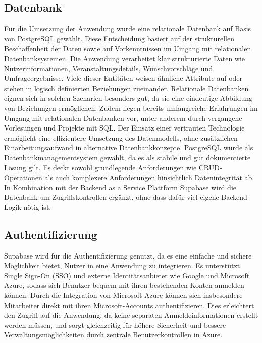 \documentclass[a4paper,12pt]{article}
\begin{document}
\subsection{Datenbank}
Für die Umsetzung der Anwendung wurde eine relationale Datenbank auf Basis von PostgreSQL gewählt. Diese Entscheidung basiert auf der strukturellen Beschaffenheit der Daten sowie auf Vorkenntnissen im Umgang mit relationalen Datenbanksystemen. Die Anwendung verarbeitet klar strukturierte Daten wie Nutzerinformationen, Veranstaltungsdetails, Wunschvorschläge und Umfrageergebnisse. Viele dieser Entitäten weisen ähnliche Attribute auf oder stehen in logisch definierten Beziehungen zueinander. Relationale Datenbanken eignen sich in solchen Szenarien besonders gut, da sie eine eindeutige Abbildung von Beziehungen ermöglichen. Zudem liegen bereits umfangreiche Erfahrungen im Umgang mit relationalen Datenbanken vor, unter anderem durch vergangene Vorlesungen und Projekte mit SQL. Der Einsatz einer vertrauten Technologie ermöglicht eine effizientere Umsetzung des Datenmodells, ohne zusätzlichen Einarbeitungsaufwand in alternative Datenbankkonzepte. PostgreSQL wurde als Datenbankmanagementsystem gewählt, da es als stabile und gut dokumentierte Lösung gilt. Es deckt sowohl grundlegende Anforderungen wie CRUD-Operationen als auch komplexere Anforderungen hinsichtlich Datenintegrität ab. In Kombination mit der Backend as a Service Plattform \gls{Supabase} wird die Datenbank um Zugriffskontrollen ergänzt, ohne dass dafür viel eigene Backend-Logik nötig ist.


\subsection{Authentifizierung}
Supabase wird für die Authentifizierung genutzt, da es eine einfache und sichere Möglichkeit bietet, Nutzer in eine Anwendung zu integrieren. Es unterstützt Single Sign-On (SSO) und externe Identitätsanbieter wie Google und Microsoft Azure, sodass sich Benutzer bequem mit ihren bestehenden Konten anmelden können. Durch die Integration von Microsoft Azure können sich insbesondere Mitarbeiter direkt mit ihren Microsoft-Accounts authentifizieren. Dies erleichtert den Zugriff auf die Anwendung, da keine separaten Anmeldeinformationen erstellt werden müssen, und sorgt gleichzeitig für höhere Sicherheit und bessere Verwaltungsmöglichkeiten durch zentrale Benutzerkontrollen in Azure.
\end{document}
